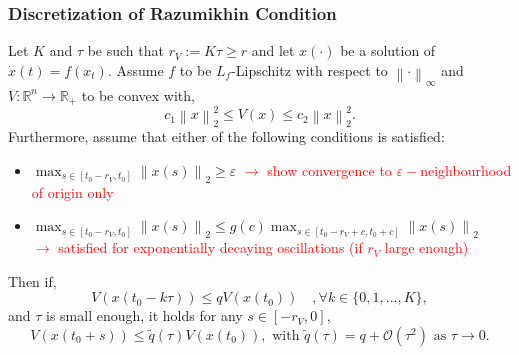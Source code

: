 \documentclass[11pt,aspectratio=169]{beamer}
\newcommand{\norm}[1]{\left\lVert#1\right\rVert}
\newcommand{\R}{\mathbb{R}}
\begin{document}
\begin{frame}[t]
    \frametitle{Discretization of Razumikhin Condition} 
Let $K$ and $\tau$ be such that $r_V:=K\tau\geq r$ and let $x(\cdot)$ be a solution of $\dot{x}(t)=f(x_t)$. Assume $f$ to be $L_f$-Lipschitz with respect to $\norm{\cdot}_\infty$ and $V:\R^n\to\R_+$ to be convex with,
$$c_1 \norm{x}_2^2 \leq V(x) \leq c_2 \norm{x}_2^2.$$ Furthermore, assume that either of the following conditions is satisfied:
\begin{itemize}
    \item  $\max_{s\in[t_0-r_V,t_0]} \norm{x(s)}_2 \geq \varepsilon$
    \textcolor{red}{$\to$ show convergence to $\varepsilon-$neighbourhood of origin only}
    \item $\max_{s\in[t_0-r_V,t_0]} \norm{x(s)}_2 \leq g(c)\max_{s\in[t_0-r_V+c,t_0+c]}\norm{x(s)}_2$ \\\vspace{0.1cm}
    \textcolor{red}{$\to$ satisfied for exponentially decaying oscillations (if $r_V$ large enough)}
\end{itemize}
Then if,
\begin{equation}
    V(x(t_0-k\tau))\leq q V(x(t_0)) \quad,\forall k\in \lbrace 0,1,...,K \rbrace,\label{eq:DiscRazConProp}
\end{equation}
and $\tau$ is small enough, it holds for any $s\in[-r_V,0]$,
\begin{equation*}
    V(x(t_0+s))\leq \tilde{q}(\tau)V(x(t_0)),
    \text{ with } \tilde{q}(\tau)= q+\mathcal{O}(\tau^2) \text{ as } \tau\to 0.
\end{equation*}
\end{frame}

\end{document}
